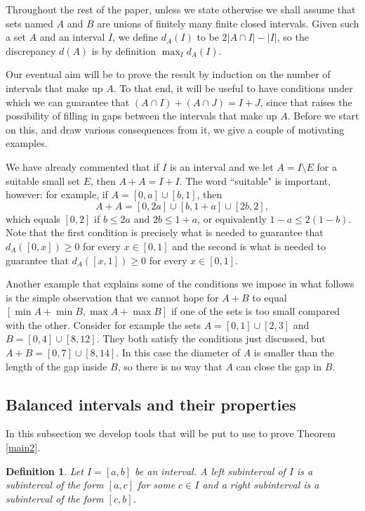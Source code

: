 \documentclass[11pt,reqno]{amsart}
\newtheorem{definition}[theorem]{Definition}
\theoremstyle{definition}
\begin{document}
Throughout the rest of the paper, unless we state otherwise we shall assume that sets named $A$ and $B$ are unions of finitely many finite closed intervals. Given such a set $A$ and an interval $I$, we define $d_A(I)$ to be $2|A\cap I|-|I|$, so the discrepancy $d(A)$ is by definition $\max_I d_A(I)$. 

Our eventual aim will be to prove the result by induction on the number of intervals that make up $A$. To that end, it will be useful to have conditions under which we can guarantee that $(A\cap I)+(A\cap J)=I+J$, since that raises the possibility of filling in gaps between the intervals that make up $A$. Before we start on this, and draw various consequences from it, we give a couple of motivating examples. 

We have already commented that if $I$ is an interval and we let $A=I\setminus E$ for a suitable small set $E$, then $A+A=I+I$. The word ``suitable" is important, however: for example, if $A=[0,a]\cup[b,1]$, then 
\[A+A=[0,2a]\cup[b,1+a]\cup[2b,2],\]
which equals $[0,2]$ if $b\leq 2a$ and $2b\leq 1+a$, or equivalently $1-a\leq 2(1-b)$. Note that the first condition is precisely what is needed to guarantee that $d_A([0,x])\geq 0$ for every $x\in[0,1]$ and the second is what is needed to guarantee that $d_A([x,1])\geq 0$ for every $x\in[0,1]$. 

Another example that explains some of the conditions we impose in what follows is the simple observation that we cannot hope for $A+B$ to equal $[\min A + \min B,\max A+\max B]$ if one of the sets is too small compared with the other. Consider for example the sets $A=[0,1]\cup[2,3]$ and $B=[0,4]\cup[8,12]$. They both satisfy the conditions just discussed, but $A+B=[0,7]\cup[8,14]$. In this case the diameter of $A$ is smaller than the length of the gap inside $B$, so there is no way that $A$ can close the gap in $B$. 

\subsection{Balanced intervals and their properties}

In this subsection we develop tools that will be put to use to prove Theorem \ref{main2}. 

\begin{definition} Let $I=[a,b]$ be an interval. A \emph{left subinterval} of $I$ is a subinterval of the form $[a,c]$ for some $c\in I$ and a \emph{right subinterval} is a subinterval of the form $[c,b]$. 
\end{definition}
\end{document}
